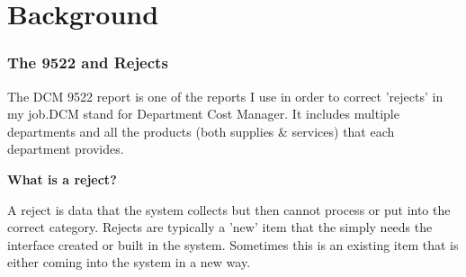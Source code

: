 \documentclass{beamer}\usepackage[]{graphicx}\usepackage[]{color}
\begin{document}
\begin{frame}[fragile]
\begin{itemize}
    \end{itemize}
\end{frame}

\section{Background}
\begin{frame}[fragile]
  \frametitle{The 9522 and Rejects}
  The DCM 9522 report is one of the reports I use in order to correct 'rejects' in my job.DCM stand for Department Cost Manager.  It includes multiple departments and all the products (both supplies & services) that each department provides.
  
  
\textbf{What is a reject?}

   A reject is data that the system collects but then cannot process or put into the correct category.  Rejects are typically a 'new' item that the simply needs the interface created or built in the system.  Sometimes this is an existing item that is either coming into the system in a new way.

\end{frame}
\end{document}
